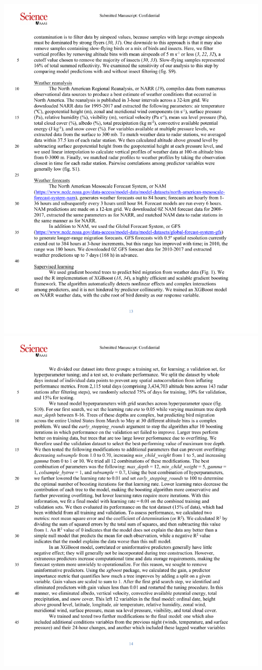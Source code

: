 \documentclass[a4paper, twoside]{templates/ociamthesis}
\begin{document}
\includegraphics[width=1\linewidth]{pdf_chapters/forecast/forecast_supp_crop_Part3}
\includegraphics[width=1\linewidth]{pdf_chapters/forecast/forecast_supp_crop_Part4}
\end{document}
